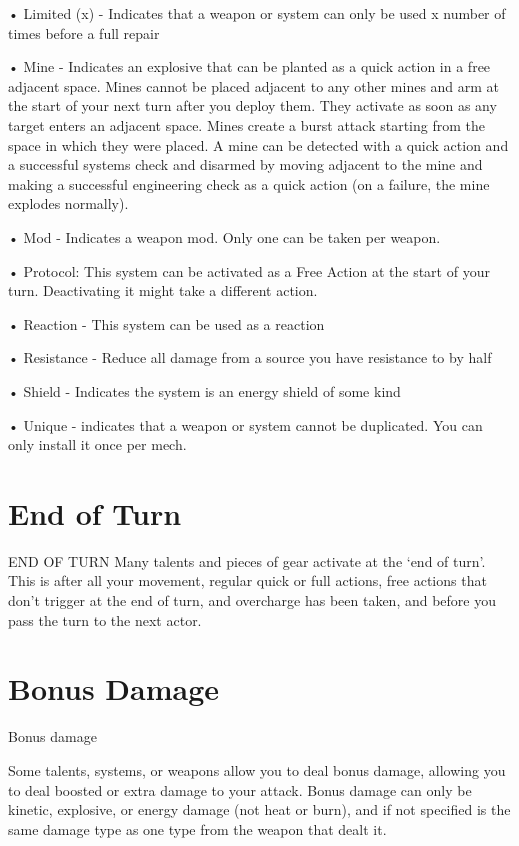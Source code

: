•  Limited (x) - Indicates that a weapon or system can only be used x number of times before a  
  full repair
 
•  Mine - Indicates an explosive that can be planted as a quick action in a free adjacent space.  
  Mines cannot be placed adjacent to any other mines and arm at the start of your next turn after  
  you deploy them. They activate as soon as any target enters an adjacent space. Mines create a  
  burst attack starting from the space in which they were placed. A mine can be detected with a  
  quick action and a successful systems check and disarmed by moving adjacent to the mine  
  and making a successful engineering check as a quick action (on a failure, the mine explodes  
  normally).
 
•  Mod - Indicates a weapon mod. Only one can be taken per weapon.
 
•  Protocol: This system can be activated as a Free Action at the start of your turn. Deactivating  
  it might take a different action.
 
•  Reaction - This system can be used as a reaction
 
•  Resistance - Reduce all damage from a source you have resistance to by half
 
•  Shield - Indicates the system is an energy shield of some kind
 
•  Unique - indicates that a weapon or system cannot be duplicated. You can only install it once  
  per mech.
 
\section{End of Turn}
                                              END OF TURN  
Many talents and pieces of gear activate at the ‘end of turn’. This is after all your movement,  
regular quick or full actions, free actions that don’t trigger at the end of turn, and overcharge has  
been taken, and before you pass the turn to the next actor.  
\section{Bonus Damage}
                                              Bonus damage  

Some talents, systems, or weapons allow you to deal bonus damage, allowing you to deal  
boosted or extra damage to your attack. Bonus damage can only be kinetic, explosive, or energy  
damage (not heat or burn), and if not specified is the same damage type as one type from the  
weapon that dealt it.
 

